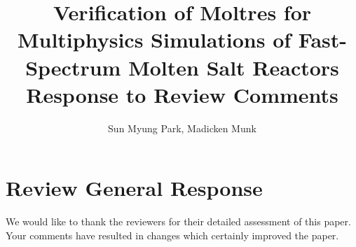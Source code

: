 \documentclass[answers,11pt]{exam}
\begin{document}


%

\title{Verification of Moltres for Multiphysics Simulations of
Fast-Spectrum Molten Salt Reactors\\
        \large Response to Review Comments}
\author{Sun Myung Park, Madicken Munk}



%
\maketitle
\section*{Review General Response}
We would like to thank the reviewers for their detailed assessment of this
paper. Your comments have resulted in changes which certainly improved the
paper.
\end{document}
